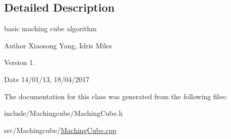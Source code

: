\subsection{Detailed Description}
basic maching cube algorithm 

\begin{DoxyAuthor}{Author}
Xiaosong Yang, Idris Miles 
\end{DoxyAuthor}
\begin{DoxyVersion}{Version}
1. 
\end{DoxyVersion}
\begin{DoxyDate}{Date}
14/01/13, 18/04/2017 
\end{DoxyDate}


The documentation for this class was generated from the following files\+:\begin{DoxyCompactItemize}
\item 
include/\+Machingcube/Maching\+Cube.\+h\item 
src/\+Machingcube/\hyperlink{MachingCube_8cpp}{Maching\+Cube.\+cpp}\end{DoxyCompactItemize}
